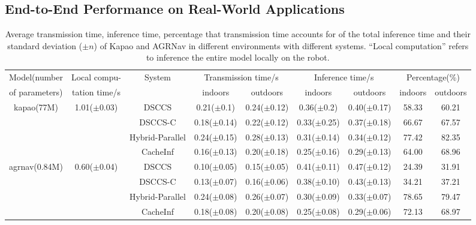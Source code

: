 \subsection{End-to-End Performance on Real-World Applications}

\begin{table}[htb]
    \centering

\begin{tabular}{ccc|c|c|c|c|c|c}
\toprule
Model(number & Local compu- & \multirow[c]{2}{*}{System} & \multicolumn{2}{|c|}{Transmission time/s} & \multicolumn{2}{|c|}{Inference time/s} & \multicolumn{2}{c}{Percentage(\%)} \\
of parameters)& tation time/s &  & indoors & outdoors & indoors & outdoors & indoors & outdoors \\
\midrule
\multirow[c]{4}{*}{kapao(77M)} & \multirow[c]{4}{*}{1.01($\pm$0.03)} & DSCCS & 0.21($\pm$0.1) & 0.24($\pm$0.12) & 0.36($\pm$0.2) & 0.40($\pm$0.17) & 58.33 & 60.21 \\
 &  & DSCCS-C & 0.18($\pm$0.14) & 0.22($\pm$0.12) & 0.33($\pm$0.25) & 0.37($\pm$0.18) & 66.67 & 67.57 \\
 &  & Hybrid-Parallel & 0.24($\pm$0.15) & 0.28($\pm$0.13) & 0.31($\pm$0.14) & 0.34($\pm$0.12) & 77.42 & 82.35 \\
 &  & CacheInf & 0.16($\pm$0.13) & 0.20($\pm$0.18) & 0.25($\pm$0.16) & 0.29($\pm$0.13) & 64.00 & 68.96 \\
\cline{1-9} \cline{2-9}
\multirow[c]{4}{*}{agrnav(0.84M)} & \multirow[c]{4}{*}{0.60($\pm$0.04)} & DSCCS & 0.10($\pm$0.05) & 0.15($\pm$0.05) & 0.41($\pm$0.11) & 0.47($\pm$0.12) & 24.39 & 31.91\\
 &  & DSCCS-C & 0.13($\pm$0.07) & 0.16($\pm$0.06) & 0.38($\pm$0.10) & 0.43($\pm$0.13) & 34.21 & 37.21\\
 &  & Hybrid-Parallel & 0.24($\pm$0.08) & 0.26($\pm$0.07) & 0.30($\pm$0.09) & 0.33($\pm$0.07) & 78.65 & 79.47 \\
 &  & CacheInf & 0.18($\pm$0.08) & 0.20($\pm$0.08) & 0.25($\pm$0.08) & 0.29($\pm$0.06) & 72.13 & 68.97 \\
\cline{1-9} \cline{2-9}
\bottomrule
\end{tabular}


    \caption{Average transmission time, inference time, percentage that transmission time accounts for of the total inference time and their standard deviation ($\pm n$) of Kapao and AGRNav in different environments with different systems. ``Local computation'' refers to inference the entire model locally on the robot.}
    \label{tab:e2e_time}
\end{table}

